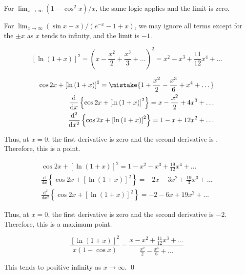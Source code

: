 \documentclass[12pt]{article}
\begin{document}
For $\lim_{x \to \infty} (1 - \cos^{2}{x})/x$, the same logic applies and the limit is zero.

For $\lim_{x \to \infty} (\sin{x} - x)/(e^{-x} - 1 + x)$, we may ignore all terms except for the $\pm x$ as $x$ tends to infinity, and the limit is $-1$.


\begin{equation}
    \left[ \ln{(1 + x)} \right]^{2} = \left( x - \frac{x^{2}}{2} + \frac{x^{3}}{3} + \dots \right)^{2} = x^{2} - x^{3} + \frac{11}{12} x^{4} + \dots
\end{equation}


\begin{equation}
    \begin{split}
        \cos{2x} + \left[ \ln{(1 + x)} \right]^{2} = \mistake{1 + \frac{x^{2}}{2} - \frac{x^{3}}{6} + x^{4} + \dots} \\
        \frac{\mathrm{d}}{\mathrm{d}x} \left\{ \cos{2x} + \left[ \ln{(1 + x)} \right]^{2} \right\} = x - \frac{x^{2}}{2} + 4x^{3} + \dots \\
        \frac{\mathrm{d}^{2}}{\mathrm{d}x^{2}} \left\{ \cos{2x} + \left[ \ln{(1 + x)} \right]^{2} \right\} = 1 - x + 12x^{2} + \dots
    \end{split}
\end{equation}

Thus, at $x = 0$, the first derivative is zero and the second derivative is . Therefore, this is a  point.

\begin{correction}
    \begin{equation}
        \begin{split}
            \cos{2x} + \left[ \ln{(1 + x)} \right]^{2} = 1 - x^{2} - x^{3} + \frac{19}{12} x^{4} + \dots \\
            \frac{\mathrm{d}}{\mathrm{d}x} \left\{ \cos{2x} + \left[ \ln{(1 + x)} \right]^{2} \right\} = -2x - 3x^{2} + \frac{19}{3}x^{3} + \dots \\
            \frac{\mathrm{d}^{2}}{\mathrm{d}x^{2}} \left\{ \cos{2x} + \left[ \ln{(1 + x)} \right]^{2} \right\} = -2 - 6x + 19x^{2} + \dots
        \end{split}
    \end{equation}

    Thus, at $x = 0$, the first derivative is zero and the second derivative is $-2$. Therefore, this is a maximum point.
\end{correction}


\begin{equation}
    \frac{\left[ \ln{(1 + x)} \right]^{2}}{x(1 - \cos{x})} = \frac{x - x^{2} + \frac{11}{12} x^{3} + \dots}{\frac{x^{2}}{2} - \frac{x^{3}}{6} + \dots}
\end{equation}

This tends to positive infinity as $x \to \infty$.
\qed
\end{document}
